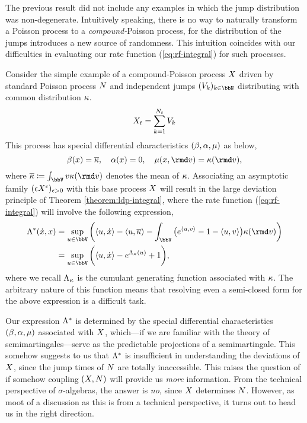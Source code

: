 The previous result did not include any examples in which the jump distribution was non-degenerate.
Intuitively speaking, there is no way to naturally transform a Poisson process to a \emph{compound-}Poisson process, for the distribution of the jumps introduces a new source of randomness.
This intuition coincides with our difficulties in evaluating our rate function (\ref{eq:rf-integral}) for such processes.

Consider the simple example of a compound-Poisson process $X$ driven by standard Poisson process $N$ and independent jumps $(V_k)_{k\in\bbN}$ distributing with common distribution $\kappa$.
\[
  X_t = \sum_{k=1}^{N_t} V_k
\]
This process has special differential characteristics $(\beta, \alpha, \mu)$ as below,
\[
  \affDrift(\stateVar) = \overline\affDist, \quad
  \affDiff(\stateVar) = 0, \quad
  \affJump(\stateVar, \rmd\markVar) = \affDist(\rmd\markVar),
\]
where $\overline\affDist \defeq \int_\vecSpace \markVar \affDist(\rmd\markVar)$ denotes the mean of $\kappa$.
Associating an asymptotic family $(\epsilon X^\epsilon)_{\epsilon>0}$ with this base process $X$ will result in the large deviation principle of Theorem \ref{theorem:ldp-integral}, where the rate function (\ref{eq:rf-integral}) will involve the following expression,
\begin{align*}
  \ode^*(\diffVar, \stateVar) 
  &= \sup_{\momentVar\in\vecSpace} \bigg( \prj{\momentVar}{\diffVar} - \prj{\momentVar}{\overline\affDist} - \int_\vecSpace \big( e^\prj{\momentVar}{\markVar} - 1 - \prj{\momentVar}{\markVar} \big) \affDist(\rmd\markVar) \bigg) \\
  &= \sup_{\momentVar\in\vecSpace} \bigg( \prj{\momentVar}{\diffVar} - e^{\ode_\affDist(\momentVar)} + 1 \bigg),
\end{align*}
where we recall $\Lambda_\kappa$ is the cumulant generating function associated with $\kappa$.
The arbitrary nature of this function means that resolving even a semi-closed form for the above expression is a difficult task.

Our expression $\Lambda^*$ is determined by the special differential characteristics $(\beta, \alpha, \mu)$ associated with $X$, which---if we are familiar with the theory of semimartingales---serve as the predictable projections of a semimartingale.
This somehow suggests to us that $\Lambda^*$ is insufficient in understanding the deviations of $X$, since the jump times of $N$ are totally inaccessible.
This raises the question of if somehow coupling $(X, N)$ will provide us \emph{more} information.
From the technical perspective of $\sigma$-algebras, the answer is \emph{no}, since $X$ determines $N$.
However, as moot of a discussion as this is from a technical perspective, it turns out to head us in the right direction.

